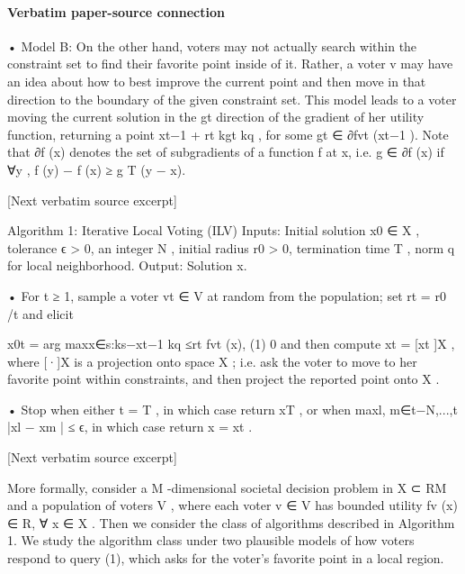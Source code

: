 \documentclass[10pt]{article}
\begin{document}
\paragraph{Verbatim paper-source connection}
\begin{ReviewVerbatim}
• Model B:       On the other hand, voters may not actually search within the constraint set
  to find their favorite point inside of it. Rather, a voter v may have an idea about how
  to best improve the current point and then move in that direction to the boundary of
  the given constraint set. This model leads to a voter moving the current solution in the
                                                                                           gt
  direction of the gradient of her utility function, returning a point xt−1 + rt
                                                                                         kgt kq , for some
  gt ∈ ∂fvt (xt−1 ). Note that ∂f (x) denotes the set of subgradients of a function f at x, i.e.
  g ∈ ∂f (x) if ∀y , f (y) − f (x) ≥ g T (y − x).

[Next verbatim source excerpt]

 Algorithm 1: Iterative Local Voting (ILV)
  Inputs: Initial solution x0 ∈ X , tolerance ϵ > 0, an integer N , initial radius r0 > 0,
    termination time T , norm q for local neighborhood.
   Output:     Solution x.

       • For t ≥ 1, sample a voter vt ∈ V at random from the population; set rt = r0 /t
           and elicit


                             x0t = arg maxx∈{s:ks−xt−1 kq ≤rt } fvt (x),             (1)
                                         0
           and then compute xt = [xt ]X , where [·]X is a projection onto space X ; i.e. ask
           the voter to move to her favorite point within constraints, and then project the
           reported point onto X .


       • Stop when either t = T , in which case return xT , or when
         maxl, m∈{t−N,...,t} |xl − xm | ≤ ϵ, in which case return x = xt .

[Next verbatim source excerpt]

   More formally, consider a M -dimensional societal decision problem in X  ⊂ RM and a
population of voters V , where each voter v ∈ V has bounded utility fv (x) ∈ R, ∀ x ∈ X .
Then we consider the class of algorithms described in Algorithm 1. We study the algorithm
class under two plausible models of how voters respond to query (1), which asks for the
voter's favorite point in a local region.




\end{ReviewVerbatim}
\end{document}
